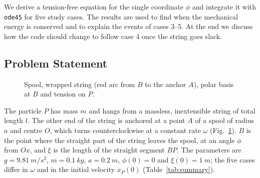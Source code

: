 \documentclass[11pt,a4paper]{article}
\numberwithin{equation}{section}
\newcommand{\er}{\hat{\mathbf{e}}_r}
\newcommand{\ephi}{\hat{\mathbf{e}}_\phi}
\begin{document}
We derive a tension-free equation for the single coordinate $\phi$ and integrate it with \texttt{ode45} for five study cases. The results are used to find when the mechanical energy is conserved and to explain the events of cases 3--5. At the end we discuss how the code should change to follow case 4 once the string goes slack.

\subsection{Problem Statement}

\begin{figure}
\vspace{-1.2em}
\centering
{}
\caption{Spool, wrapped string (red arc from $B$ to the anchor $A$), polar basis at $B$ and tension on $P$.}
\label{fig:sketch}
\vspace{-1em}
\end{figure}

The particle $P$ has mass $m$ and hangs from a massless, inextensible string of total length $l$. The other end of the string is anchored at a point $A$ of a spool of radius $a$ and centre $O$, which turns counterclockwise at a constant rate $\omega$ (Fig.~\ref{fig:sketch}). $B$ is the point where the straight part of the string leaves the spool, at an angle $\phi$ from $Ox$, and $\xi$ is the length of the straight segment $BP$. The parameters are $g=\SI{9.81}{m/s^2}$, $m=\SI{0.1}{kg}$, $a=\SI{0.2}{m}$, $\phi(0)=0$ and $\xi(0)=\SI{1}{m}$; the five cases differ in $\omega$ and in the initial velocity $\dot x_P(0)$ (Table~\ref{tab:summary}).
\end{document}
